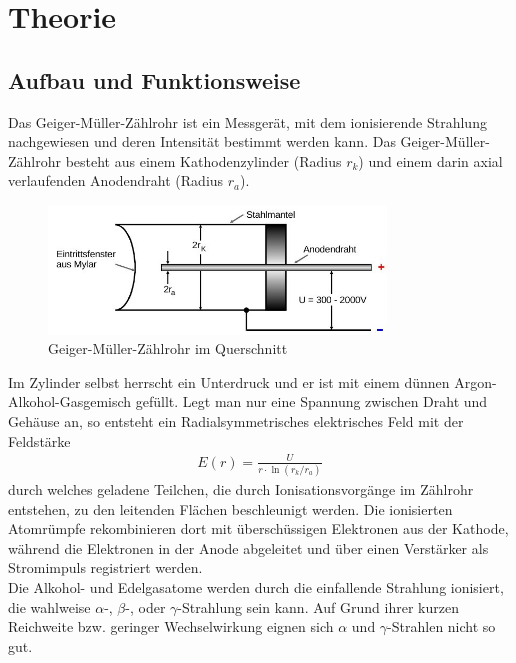 

\section{Theorie}
\subsection{Aufbau und Funktionsweise}
Das Geiger-Müller-Zählrohr ist ein Messgerät, mit dem ionisierende Strahlung nachgewiesen und deren Intensität bestimmt werden kann. Das Geiger-Müller-Zählrohr besteht aus einem Kathodenzylinder (Radius $r_k$) und einem darin axial verlaufenden Anodendraht (Radius $r_a$). 
\begin{figure}[htbp]
	\includegraphics[width=0.8\textwidth]{pics/zaehlrohr.jpg}
	\caption{Geiger-Müller-Zählrohr im Querschnitt}
\end{figure}
Im Zylinder selbst herrscht ein Unterdruck und er ist mit einem dünnen Argon-Alkohol-Gasgemisch gefüllt. Legt man nur eine Spannung zwischen Draht und Gehäuse an, so entsteht ein Radialsymmetrisches elektrisches Feld mit der Feldstärke
\begin{align}
	E(r)= \frac{U}{r\cdot \ln (r_k / r_a)}
	\label{eq_efeld}
\end{align}
durch welches geladene Teilchen, die durch Ionisationsvorgänge im Zählrohr entstehen, zu den leitenden Flächen beschleunigt werden. Die ionisierten Atomrümpfe rekombinieren dort mit überschüssigen Elektronen aus der Kathode, während die Elektronen in der Anode abgeleitet und über einen Verstärker als Stromimpuls registriert werden.\\

Die Alkohol- und Edelgasatome werden durch die einfallende Strahlung ionisiert, die wahlweise $\alpha$-, $\beta$-, oder $\gamma$-Strahlung sein kann. Auf Grund ihrer kurzen Reichweite bzw. geringer Wechselwirkung eignen sich $\alpha \text{ und } \gamma$-Strahlen nicht so gut.

